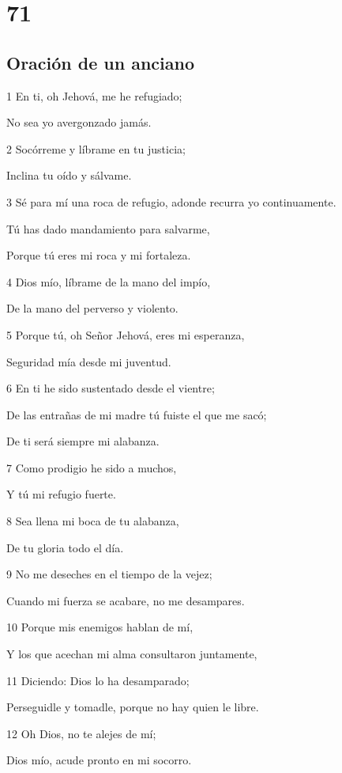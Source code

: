 \chapter{71}

\section*{Oración de un anciano}

\par 1 En ti, oh Jehová, me he refugiado;
\par No sea yo avergonzado jamás.
\par 2 Socórreme y líbrame en tu justicia;
\par Inclina tu oído y sálvame.
\par 3 Sé para mí una roca de refugio, adonde recurra yo continuamente.
\par Tú has dado mandamiento para salvarme,
\par Porque tú eres mi roca y mi fortaleza.
\par 4 Dios mío, líbrame de la mano del impío,
\par De la mano del perverso y violento.
\par 5 Porque tú, oh Señor Jehová, eres mi esperanza,
\par Seguridad mía desde mi juventud.
\par 6 En ti he sido sustentado desde el vientre;
\par De las entrañas de mi madre tú fuiste el que me sacó;
\par De ti será siempre mi alabanza.
\par 7 Como prodigio he sido a muchos,
\par Y tú mi refugio fuerte.
\par 8 Sea llena mi boca de tu alabanza,
\par De tu gloria todo el día.
\par 9 No me deseches en el tiempo de la vejez;
\par Cuando mi fuerza se acabare, no me desampares.
\par 10 Porque mis enemigos hablan de mí,
\par Y los que acechan mi alma consultaron juntamente,
\par 11 Diciendo: Dios lo ha desamparado;
\par Perseguidle y tomadle, porque no hay quien le libre.
\par 12 Oh Dios, no te alejes de mí;
\par Dios mío, acude pronto en mi socorro.
